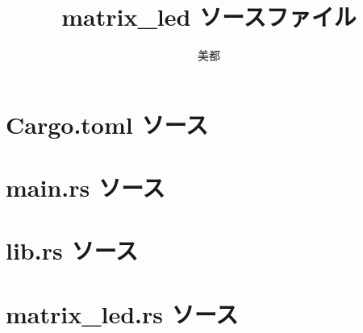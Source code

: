 \documentclass[a4paper, 10pt]{jsarticle}
\title{matrix\_led ソースファイル}
\author{美都}
\begin{document}
\maketitle
\tableofcontents
\clearpage

\section {Cargo.toml ソース}

\clearpage

\section {main.rs ソース}

\clearpage

\section {lib.rs ソース}

\clearpage

\section {matrix\_led.rs ソース}

\clearpage
\end{document}
